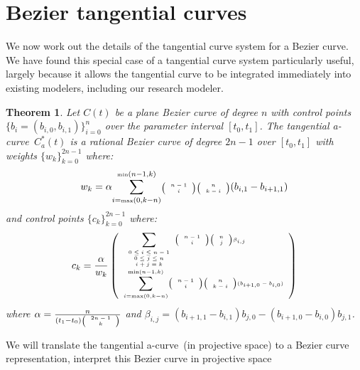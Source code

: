 \documentclass[12pt]{article}
\newcommand{\prf}{\noindent{{\bf Proof}:\ \ \ }}
\newcommand{\tinychoice}[2]{\mbox{\tiny{$\left( \begin{array}{c} #1 \\ #2 \end{array} \right)$}}}
\newtheorem{theorem}{Theorem}[section]
\newcommand{\atang}{tangential a-curve\ }
\begin{document}

\section{Bezier tangential curves}
\label{sec:bez}

We now work out the details of the tangential curve system for a Bezier curve.
We have found this special case of a tangential curve system particularly useful,
largely because it allows the tangential curve to be integrated immediately
into existing modelers, including our research modeler.

\begin{theorem}
\label{thm:Bezier}
Let $C(t)$ be a plane Bezier curve of degree $n$
with control points $\{ b_i = (b_{i,0}, b_{i,1}) \}_{i=0}^n$ 
over the parameter interval $[t_0,t_1]$.
The \atang $C_a^*(t)$ is a rational Bezier curve
of degree $2n-1$ over $[t_0,t_1]$ with weights $\{w_k\}_{k=0}^{2n-1}$ where: 
\begin{equation}
\label{eq:wt}
w_k = 	\alpha 
\displaystyle{\sum_{i=\mbox{\tiny{max}}(0,k-n)}^{\mbox{\tiny{min}}(n-1,k)}}
	\tinychoice{n-1}{i} \tinychoice{n}{k-i} (b_{i,1} - b_{i+1,1})
\end{equation}
%
and control points $\{c_k\}_{k=0}^{2n-1}$ where:
\begin{displaymath}
\tiny{
c_k = \frac{\alpha}{w_k} 
\left(
\begin{array}{l}
	\displaystyle{\sum_{\begin{array}{c} \mbox{\tiny{$0 \leq i \leq n-1$}} \\ 
		       \mbox{\tiny{$0 \leq j \leq n$}} \\ 
		       \mbox{\tiny{$i+j=k$}} \end{array}}}
	\tinychoice{n-1}{i} \tinychoice{n}{j} \beta_{i,j} \\
%	
	\displaystyle{\sum_{i=\mbox{\tiny{max}}(0,k-n)}^{\mbox{\tiny{min}}(n-1,k)}}
	\tinychoice{n-1}{i} \tinychoice{n}{k-i} (b_{i+1,0} - b_{i,0})
\end{array}
\right)
}
\end{displaymath}
where $\alpha = \tiny{\frac{n}{(t_1 - t_0) \tinychoice{2n-1}{k}}}$
and $\beta_{i,j} = (b_{i+1,1} - b_{i,1}) b_{j,0} - (b_{i+1,0} - b_{i,0}) b_{j,1}$.
\end{theorem}
%
%
\prf
We will translate the \atang (in projective space) to a Bezier curve representation,
interpret this Bezier curve in projective space
\end{document}
